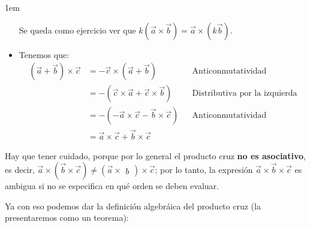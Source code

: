 \documentclass[12pt, fleqn]{report}                             %
\newenvironment{SmallIndentation}[1][0.75em]                    %
        {\begin{adjustwidth}{#1}{}\begin{footnotesize}}             %
        {\end{footnotesize}\end{adjustwidth}}                       %
\theoremstyle{break}                                            %
\newcommand{\Wrap}[1]{\left( #1 \right)}                        %
\newcommand{\Vector}[1]                                         %
        { \ensuremath{\begin{matrix}#1\end{matrix}} }               %
\begin{document}
\begin{SmallIndentation}[1em]
\begin{itemize}
                    Se queda como ejercicio ver que $k\Wrap{\vec{a} \times \vec{b}} = \vec{a} \times \Wrap{k \vec{b}}$.
                    
                    \item Tenemos que:
                    \begin{align*}
	                    \Wrap{\vec{a} + \vec{b}} \times \vec{c} &= -\vec{c} \times \Wrap{\vec{a} + \vec{b}} &&\mbox{Anticonmutatividad}\\
	                    &= -\Wrap{\vec{c} \times \vec{a} + \vec{c} \times \vec{b}} &&\mbox{Distributiva por la izquierda}\\
	                    &= -\Wrap{-\vec{a} \times \vec{c} - \vec{b} \times \vec{c}} &&\mbox{Anticonmutatividad}\\
	                    &= \vec{a} \times \vec{c} + \vec{b} \times \vec{c}
                    \end{align*}
                \end{itemize}
            \end{SmallIndentation}
        
            Hay que tener cuidado, porque por lo general el producto cruz \textbf{no es asociativo}, es decir, $\vec{a} \times \Wrap{\vec{b} \times \vec{c}} \neq \Wrap{\vec{a} \times \Vector{b}} \times \vec{c}$; por lo tanto, la expresión $\vec{a} \times \vec{b} \times \vec{c}$ es ambigua si no se especifica en qué orden se deben evaluar.
            
            Ya con eso podemos dar la definición algebráica del producto cruz (la presentaremos como un teorema):
            
            
\end{document}
